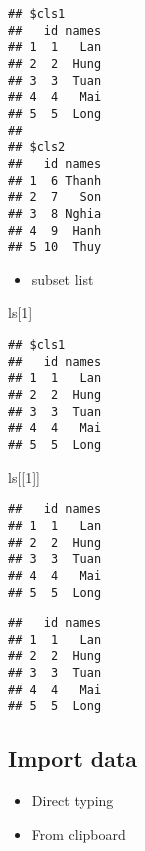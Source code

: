 \documentclass[
  a4paper,
]{article}
\newenvironment{Shaded}{\begin{snugshade}}{\end{snugshade}}
\newcommand{\DecValTok}[1]{\textcolor[rgb]{0.00,0.00,0.81}{#1}}
\newcommand{\NormalTok}[1]{#1}
\newcommand{\SpecialCharTok}[1]{\textcolor[rgb]{0.81,0.36,0.00}{\textbf{#1}}}
\providecommand{\tightlist}{%
  \setlength{\itemsep}{0pt}\setlength{\parskip}{0pt}}
\begin{document}
\begin{verbatim}
## $cls1
##   id names
## 1  1   Lan
## 2  2  Hung
## 3  3  Tuan
## 4  4   Mai
## 5  5  Long
## 
## $cls2
##   id names
## 1  6 Thanh
## 2  7   Son
## 3  8 Nghia
## 4  9  Hanh
## 5 10  Thuy
\end{verbatim}

\begin{itemize}
\tightlist
\item
  subset list
\end{itemize}

\begin{Shaded}
\begin{Highlighting}[]
\NormalTok{ls[}\DecValTok{1}\NormalTok{]}
\end{Highlighting}
\end{Shaded}

\begin{verbatim}
## $cls1
##   id names
## 1  1   Lan
## 2  2  Hung
## 3  3  Tuan
## 4  4   Mai
## 5  5  Long
\end{verbatim}

\begin{Shaded}
\begin{Highlighting}[]
\NormalTok{ls[[}\DecValTok{1}\NormalTok{]]}
\end{Highlighting}
\end{Shaded}

\begin{verbatim}
##   id names
## 1  1   Lan
## 2  2  Hung
## 3  3  Tuan
## 4  4   Mai
## 5  5  Long
\end{verbatim}

\begin{Shaded}
\end{Shaded}

\begin{verbatim}
##   id names
## 1  1   Lan
## 2  2  Hung
## 3  3  Tuan
## 4  4   Mai
## 5  5  Long
\end{verbatim}

\subsection{Import data}\label{import-data}

\begin{itemize}
\tightlist
\item
  Direct typing
\item
  From clipboard
\end{itemize}
\end{document}
